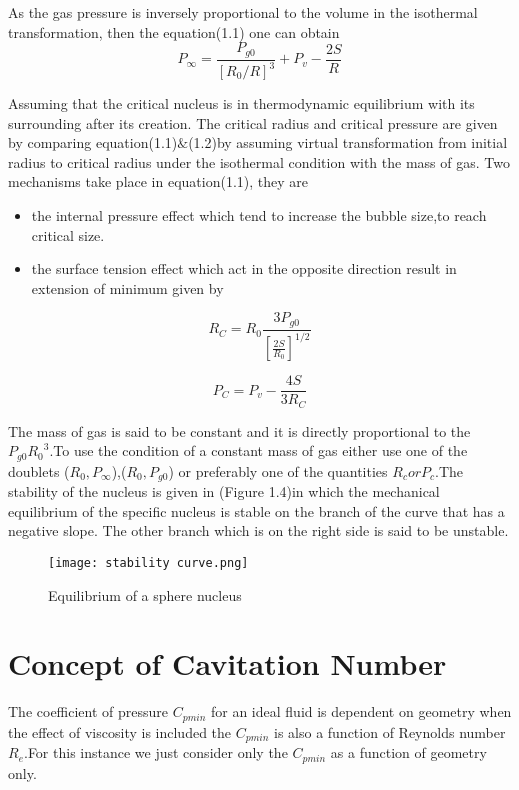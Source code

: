 As the gas pressure is inversely proportional to the volume in the
isothermal transformation, then the equation(1.1) one can obtain
\begin{equation}
P_{\infty} =\frac{P_{g0}}{{[{R_0}/{R}]}^{3}} +P_v -\frac{2S}{R}
\end{equation}

Assuming that the critical nucleus is in thermodynamic equilibrium
with its surrounding after its creation. The critical radius and
critical pressure are given by comparing equation(1.1)$\&$(1.2)by
assuming virtual transformation from initial radius to critical radius
under the isothermal condition with the mass of gas. Two mechanisms
take place in equation(1.1), they are

\begin{itemize}
  \item the internal pressure effect which tend to increase the bubble
    size,to reach critical size.
  \item the surface tension effect which act in the opposite direction
    result in extension of minimum given by
\end{itemize}

\begin{equation}
R_C = R_0 \frac {3P_{g0}}{[{\frac{2S}{R_0}}]^{1/2}}
\end{equation}
  
\begin{equation}
  P_C = P_v -{\frac{4S}{3R_C}}
\end{equation}

The mass of gas is said to be constant and it is directly proportional
to the $P_{g0}{{R_0}^3}$.To use the condition of a constant mass of
gas either use one of the doublets ($R_0 ,P_{\infty}$),($R_0,P_{g0}$)
or preferably one of the quantities $R_c or P_c $.The stability of the
nucleus is given in (Figure 1.4)in which the mechanical equilibrium of
the specific nucleus is stable on the branch of the curve that has a
negative slope. The other branch which is on the right side is said to
be unstable.\\

\begin{figure}[H]
  \centering
  \texttt{[image: stability curve.png]}
  \caption{Equilibrium of a sphere nucleus}
  \label{fig:fig4}
\end{figure}

\section{Concept of Cavitation Number}
The coefficient of pressure $C_{pmin}$ for an ideal fluid is dependent
on geometry when the effect of viscosity is included the $C_{pmin}$ is
also a function of Reynolds number $R_e$.For this instance we just
consider only the $C_{pmin}$ as a function of geometry only.
    

